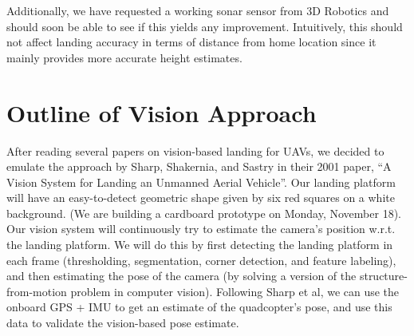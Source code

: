 \documentclass[10pt, twocolumn]{scrartcl} %
\begin{document}
Additionally, we have requested a working sonar sensor from 3D Robotics and should soon be able to see if this yields any improvement. Intuitively, this should not affect landing accuracy in terms of distance from home location since it mainly provides more accurate height estimates.

\section{Outline of Vision Approach}

After reading several papers on vision-based landing for UAVs, we decided to
emulate the approach by Sharp, Shakernia, and Sastry in their 2001 paper, ``A
Vision System for Landing an Unmanned Aerial Vehicle''. Our landing platform
will have an easy-to-detect geometric shape given by six red squares on a white
background. (We are building a cardboard prototype on Monday, November 18). Our
vision system will continuously try to estimate the camera's position w.r.t.
the landing platform. We will do this by first detecting the landing platform
in each frame (thresholding, segmentation, corner detection, and feature
labeling), and then estimating the pose of the camera (by solving a version of
the structure-from-motion problem in computer vision). Following Sharp et al,
we can use the onboard GPS + IMU to get an estimate of the quadcopter's pose,
and use this data to validate the vision-based pose estimate.
\end{document}
